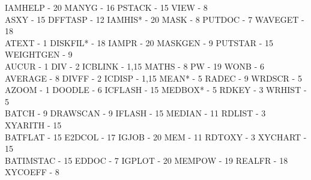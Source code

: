 {\begin{tabbing}
   \>IAMHELP - 20                            \>
 MANYG - 16                              \>PSTACK - 15                           
   \>VIEW - 8                                \\
 ASXY - 15                               \>DFFTASP - 12                          
   \>IAMHIS* - 20                            \>
 MASK - 8                                \>PUTDOC - 7                            
   \>WAVEGET - 18                            \\
 ATEXT - 1                               \>DISKFIL* - 18                         
   \>IAMPR - 20                              \>
 MASKGEN - 9                             \>PUTSTAR - 15                          
   \>WEIGHTGEN - 9                           \\
 AUCUR - 1                               \>DIV - 2                               
   \>ICBLINK - 1,15                          \>
 MATHS - 8                               \>PW - 19                               
   \>WONB - 6                                \\
 AVERAGE - 8                             \>DIVFF - 2                             
   \>ICDISP - 1,15                           \>
 MEAN* - 5                               \>RADEC - 9                             
   \>WRDSCR - 5                              \\
 AZOOM - 1                               \>DOODLE - 6                            
   \>ICFLASH - 15                            \>
 MEDBOX* - 5                             \>RDKEY - 3                             
   \>WRHIST - 5                              \\
 BATCH - 9                               \>DRAWSCAN - 9                          
   \>IFLASH - 15                             \>
 MEDIAN - 11                             \>RDLIST - 3                            
   \>XYARITH - 15                            \\
 BATFLAT - 15                            \>E2DCOL - 17                           
   \>IGJOB - 20                              \>
 MEM - 11                                \>RDTOXY - 3                            
   \>XYCHART - 15                            \\
 BATIMSTAC - 15                          \>EDDOC - 7                             
   \>IGPLOT - 20                             \>
 MEMPOW - 19                             \>REALFR - 18                           
   \>XYCOEFF - 8                             \\

\end{tabbing}}
